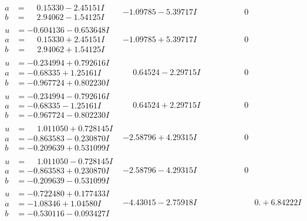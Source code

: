 \documentclass[1p]{elsarticle_modified}
\theoremstyle{definition}
\begin{document}
$$\begin{array}{c|c|c}
\begin{aligned}
a &= \phantom{-}0.15330 - 2.45151 I \\
b &= \phantom{-}2.94062 - 1.54125 I\end{aligned}
 & -1.09785 - 5.39717 I & \phantom{-0.000000 } 0 \\ \hline\begin{aligned}
u &= -0.604136 - 0.653648 I \\
a &= \phantom{-}0.15330 + 2.45151 I \\
b &= \phantom{-}2.94062 + 1.54125 I\end{aligned}
 & -1.09785 + 5.39717 I & \phantom{-0.000000 } 0 \\ \hline\begin{aligned}
u &= -0.234994 + 0.792616 I \\
a &= -0.68335 + 1.25161 I \\
b &= -0.967724 + 0.802230 I\end{aligned}
 & \phantom{-}0.64524 - 2.29715 I & \phantom{-0.000000 } 0 \\ \hline\begin{aligned}
u &= -0.234994 - 0.792616 I \\
a &= -0.68335 - 1.25161 I \\
b &= -0.967724 - 0.802230 I\end{aligned}
 & \phantom{-}0.64524 + 2.29715 I & \phantom{-0.000000 } 0 \\ \hline\begin{aligned}
u &= \phantom{-}1.011050 + 0.728145 I \\
a &= -0.863583 - 0.230870 I \\
b &= -0.209639 + 0.531099 I\end{aligned}
 & -2.58796 + 4.29315 I & \phantom{-0.000000 } 0 \\ \hline\begin{aligned}
u &= \phantom{-}1.011050 - 0.728145 I \\
a &= -0.863583 + 0.230870 I \\
b &= -0.209639 - 0.531099 I\end{aligned}
 & -2.58796 - 4.29315 I & \phantom{-0.000000 } 0 \\ \hline\begin{aligned}
u &= -0.722480 + 0.177433 I \\
a &= -1.08346 + 1.04580 I \\
b &= -0.530116 - 0.093427 I\end{aligned}
 & -4.43015 - 2.75918 I & \phantom{-0.000000 -}0. + 6.84222 I \\ \hline\begin{aligned}

\end{aligned}
\end{array}$$
\end{document}
